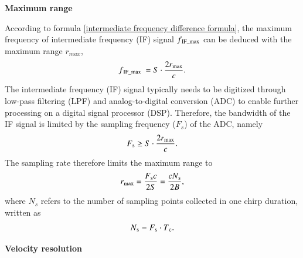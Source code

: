 \documentclass[12pt,DIV14,BCOR12mm,a4paper,footinclude=false,headinclude,parskip=half-,twoside,openright,cleardoublepage=empty,toc=index,bibliography=totoc,listof=totoc]{scrreprt}
\numberwithin{equation}{chapter}
\begin{document}
\begin{spacing}{1.5}
\textbf{\large{Maximum range}}
\end{spacing}

According to formula \ref{intermediate frequency difference formula}, the maximum frequency of intermediate frequency (IF) signal $f\textsubscript{IF\_max}$ can be deduced with the maximum range $r_{max}$,
\begin{equation}
    \centering
    f\textsubscript{IF\_max}\ = S \cdot \frac{2r\textsubscript{max}}{c}.
\end{equation}
The intermediate frequency (IF) signal typically needs to be digitized through low-pass filtering (LPF) and analog-to-digital conversion (ADC) to enable further processing on a digital signal processor (DSP). Therefore, the bandwidth of the IF signal is limited by the sampling frequency ($F_s$) of the ADC, namely
\begin{equation}
    \centering
    F\textsubscript{s} \geq S \cdot \frac{2r\textsubscript{max}}{c}.
\end{equation}
The sampling rate therefore limits the maximum range to
\begin{equation}
    \centering
    r\textsubscript{max} = \frac{F\textsubscript{s}c}{2S} = \frac{cN\textsubscript{s}}{2B},
    \label{maximum range formula}
\end{equation}
where $N_s$ refers to the number of sampling points collected in one chirp duration, written as
\begin{equation}
    \centering
    N\textsubscript{s} = F\textsubscript{s} \cdot T\textsubscript{c}.
    \label{sampling frequency formula}
\end{equation}

\begin{spacing}{1.5}
\textbf{\large{Velocity resolution}}
\end{spacing}
\end{document}
